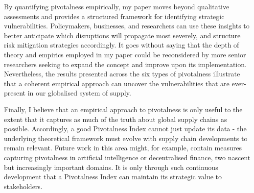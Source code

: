\documentclass[11pt]{article}
\begin{document}
By quantifying pivotalness empirically, my paper moves beyond qualitative assessments and provides a structured framework for identifying strategic vulnerabilities. Policymakers, businesses, and researchers can use these insights to better anticipate which disruptions will propagate most severely, and structure risk mitigation strategies accordingly. It goes without saying that the depth of theory and empirics employed in my paper could be reconsidered by more senior researchers seeking to expand the concept and improve upon its implementation. Nevertheless, the results presented across the six types of pivotalness illustrate that a coherent empirical approach can uncover the vulnerabilities that are ever-present in our globalised system of supply. 

Finally, I believe that an empirical approach to pivotalness is only useful to the extent that it captures as much of the truth about global supply chains as possible. Accordingly, a good Pivotalness Index cannot just update its data - the underlying theoretical framework must evolve with supply chain developments to remain relevant. Future work in this area might, for example, contain measures capturing pivotalness in artificial intelligence or decentralised finance, two nascent but increasingly important domains. It is only through such continuous development that a Pivotalness Index can maintain its strategic value to stakeholders.


\newpage
\raggedright
\let\oldthebibliography\thebibliography
\renewcommand\bf{}
\renewcommand\em{}

\end{document}

